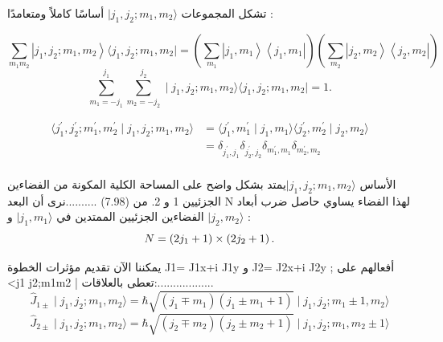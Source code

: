 تشكل المجموعات  $|j_1, j_2 ; m_1, m_2\rangle $ أساسًا كاملاً ومتعامدًا :

\begin{equation}
\sum_{m_1 m_2}\left|j_1, j_2 ; m_1, m_2\right\rangle\langle j_1, j_2 ; m_1, m_2 \mid=\left(\sum_{m_1}\left|j_1, m_1\right\rangle\left\langle j_1, m_1 \right|\right)\left(\sum_{m_2}\left|j_2, m_2\right\rangle\left\langle j_2, m_2\right|\right)
\end{equation}
\begin{equation}
\sum_{m_1=-j_1}^{j_1} \sum_{m_2=-j_2}^{j_2} \mid j_1, j_2 ; m_1, m_2\rangle \langle j_1, j_2 ; m_1, m_2 \mid=1.
\end{equation} 

\begin{equation}
	\begin{aligned}
	\langle j_1^{\prime}, j_2^{\prime} ; m_1^{\prime}, m_2^{\prime}\mid j_1, j_2 ; m_1, m_2 \rangle &=\langle j_1^{\prime}, m_1^{\prime}\mid j_1, m_1 \rangle \langle j_2^{\prime}, m_2^{\prime}\mid j_2, m_2\rangle \\ &= 
	\delta_{j_1^{\prime}, j_1} \delta_{j_2^{\prime}, j_2} \delta_{m_1^{\prime}, m_1} \delta_{m_2^{\prime}, m_2} \\	\end{aligned}
\end{equation}

الأساس $|j_1, j_2 ; m_1, m_2 \rangle$يمتد بشكل واضح على المساحة الكلية المكونة من الفضاءين الجزئيين 1 و 2. 
من (7.98) ..........نرى أن البعد N لهذا الفضاء يساوي حاصل ضرب أبعاد الفضاءين الجزئيين الممتدين في
$ \mid j_1, m_1 \rangle$
و $\mid j_2, m_2\rangle  $ :
\begin{equation}
	N=\left(2 j_1+1\right) \times\left(2 j_2+1\right) . \\
\end{equation}

يمكننا الآن تقديم مؤثرات الخطوة  J1= J1x+i J1y و J2= J2x+i J2y ; أفعالهم على <j1 j2;m1m2 |
تعطى بالعلاقات:..................
\begin{equation}
	\hat{J}_{1 \pm} \mid j_1, j_2 ; m_1, m_2\rangle=\hbar \sqrt{\left(j_1 \mp m_1\right)\left(j_1 \pm m_1+1\right)}\mid j_1, j_2 ; m_1 \pm 1, m_2\rangle
\end{equation}
\begin{equation}
	\hat{J}_{2 \pm} \mid j_1, j_2 ; m_1, m_2\rangle=\hbar \sqrt{\left(j_2 \mp m_2\right)\left(j_2 \pm m_2+1\right)}\mid j_1, j_2 ; m_1 , m_2\pm 1\rangle
\end{equation}



